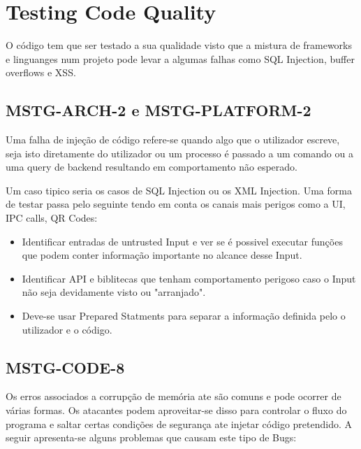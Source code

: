 \section{Testing Code Quality}




O código tem que ser testado a sua qualidade visto que a mistura de frameworks e linguanges num projeto pode levar a algumas falhas como SQL Injection, buffer overflows e XSS.

\subsection{MSTG-ARCH-2 e MSTG-PLATFORM-2}

Uma falha de injeção de código refere-se quando algo que o utilizador escreve, seja isto diretamente do utilizador ou um processo é passado a um comando ou a uma query de backend resultando em comportamento não esperado.

Um caso tipico seria os casos de SQL Injection ou os XML Injection. Uma forma de testar passa pelo seguinte tendo em conta os canais mais perigos como a UI, IPC calls, QR Codes:

\begin{itemize}

\item Identificar entradas de untrusted Input e ver se é possivel executar funções que podem conter informação importante no alcance desse Input.

\item Identificar API e biblitecas que tenham comportamento perigoso caso o Input não seja devidamente visto ou "arranjado".

\item Deve-se usar Prepared Statments para separar a informação definida pelo o utilizador e o código.


\end{itemize}

\subsection{MSTG-CODE-8}

Os erros associados a corrupção de memória ate são comuns e pode ocorrer de várias formas. Os atacantes podem aproveitar-se disso para controlar o fluxo do programa e saltar certas condições de segurança ate injetar código pretendido. A seguir apresenta-se alguns problemas que causam este tipo de Bugs:

